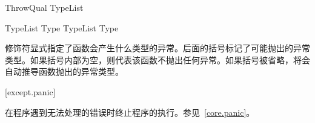 \begin{bnf}{ThrowQual}
     \terminal{(} TypeList\bnfs \terminal{)} \br
\end{bnf}

\begin{bnf}{TypeList}
    Type \br
    TypeList \terminal{,} Type
\end{bnf}

\pnum
{}修饰符显式指定了函数会产生什么类型的异常。后面的括号标记了可能抛出的异常类型。如果括号内部为空，则代表该函数不抛出任何异常。如果括号被省略，将会自动推导函数抛出的异常类型。

[except.panic]{}

\pnum
{}在程序遇到无法处理的错误时终止程序的执行。参见~\ref{core.panic}。